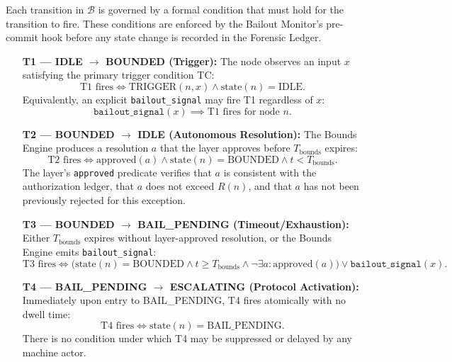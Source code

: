 Each transition in $\mathcal{B}$ is governed by a formal condition that must hold for the transition to fire. These conditions are enforced by the Bailout Monitor's pre-commit hook before any state change is recorded in the Forensic Ledger.

\begin{enumerate}
\item[\textbf{T1 — IDLE $\rightarrow$ BOUNDED (Trigger):}] The node observes an input $x$ satisfying the primary trigger condition TC:
\begin{equation}
\text{T1 fires} \iff \text{TRIGGER}(n, x) \land \text{state}(n) = \text{IDLE}. \tag{T1}
\end{equation}
Equivalently, an explicit \texttt{bailout\_signal} may fire T1 regardless of $x$:
\begin{equation}
\texttt{bailout\_signal}(x) \implies \text{T1 fires for node } n. \tag{T1-alt}
\end{equation}

\item[\textbf{T2 — BOUNDED $\rightarrow$ IDLE (Autonomous Resolution):}] The Bounds Engine produces a resolution $a$ that the \fact{} layer approves before $T_{\text{bounds}}$ expires:
\begin{equation}
\text{T2 fires} \iff \text{approved}(a) \land \text{state}(n) = \text{BOUNDED} \land t < T_{\text{bounds}}. \tag{T2}
\end{equation}
The \fact{} layer's \texttt{approved} predicate verifies that $a$ is consistent with the authorization ledger, that $a$ does not exceed $R(n)$, and that $a$ has not been previously rejected for this exception.

\item[\textbf{T3 — BOUNDED $\rightarrow$ BAIL\_PENDING (Timeout/Exhaustion):}] Either $T_{\text{bounds}}$ expires without \fact{} layer-approved resolution, or the Bounds Engine emits \texttt{bailout\_signal}:
\begin{equation}
\text{T3 fires} \iff \bigl(\text{state}(n) = \text{BOUNDED} \land t \geq T_{\text{bounds}} \land \neg\exists a: \text{approved}(a)\bigr) \lor \texttt{bailout\_signal}(x). \tag{T3}
\end{equation}

\item[\textbf{T4 — BAIL\_PENDING $\rightarrow$ ESCALATING (Protocol Activation):}] Immediately upon entry to BAIL\_PENDING, T4 fires atomically with no dwell time:
\begin{equation}
\text{T4 fires} \iff \text{state}(n) = \text{BAIL\_PENDING}. \tag{T4}
\end{equation}
There is no condition under which T4 may be suppressed or delayed by any machine actor.


\end{enumerate}
